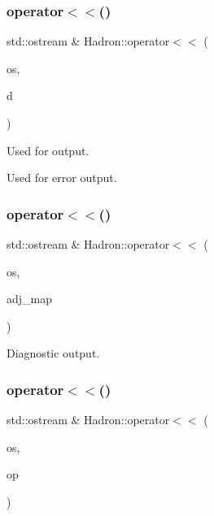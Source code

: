 \subsubsection{\texorpdfstring{operator$<$$<$()}{operator<<()}\hspace{0.1cm}{\footnotesize\ttfamily [33/48]}}
{\footnotesize\ttfamily std\+::ostream \& Hadron\+::operator$<$$<$ (\begin{DoxyParamCaption}\item[{std\+::ostream \&}]{os,  }\item[{const \mbox{\hyperlink{structHadron_1_1KeyHadronSUNNPartIrrepOp__t}{Key\+Hadron\+S\+U\+N\+N\+Part\+Irrep\+Op\+\_\+t}} \&}]{d }\end{DoxyParamCaption})}



Used for output. 

Used for error output. \mbox{\label{namespaceHadron_aefc74b3ac5cc28e73ed7a9e24b032449}} 
\subsubsection{\texorpdfstring{operator$<$$<$()}{operator<<()}\hspace{0.1cm}{\footnotesize\ttfamily [34/48]}}
{\footnotesize\ttfamily std\+::ostream \& Hadron\+::operator$<$$<$ (\begin{DoxyParamCaption}\item[{std\+::ostream \&}]{os,  }\item[{const \mbox{\hyperlink{namespaceHadron_ad6387ffed6a1bf53021dce29b71d3a04}{Hadron\+Graph\+Adj\+Map\+\_\+t}} \&}]{adj\+\_\+map }\end{DoxyParamCaption})}



Diagnostic output. 

\mbox{\label{namespaceHadron_a0dfff614f40f815cfb78d828c07bc8aa}} 
\subsubsection{\texorpdfstring{operator$<$$<$()}{operator<<()}\hspace{0.1cm}{\footnotesize\ttfamily [35/48]}}
{\footnotesize\ttfamily std\+::ostream \& Hadron\+::operator$<$$<$ (\begin{DoxyParamCaption}\item[{std\+::ostream \&}]{os,  }\item[{const \mbox{\hyperlink{structHadron_1_1KeySingleHadronQuarkSpin__t}{Key\+Single\+Hadron\+Quark\+Spin\+\_\+t}} \&}]{op }\end{DoxyParamCaption})}


